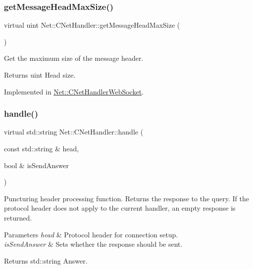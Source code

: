 \subsubsection{\texorpdfstring{get\+Message\+Head\+Max\+Size()}{getMessageHeadMaxSize()}}
{\footnotesize\ttfamily virtual uint Net\+::\+C\+Net\+Handler\+::get\+Message\+Head\+Max\+Size (\begin{DoxyParamCaption}{ }\end{DoxyParamCaption})\hspace{0.3cm}{\ttfamily [pure virtual]}}



Get the maximum size of the message header. 

\begin{DoxyReturn}{Returns}
uint Head size. 
\end{DoxyReturn}


Implemented in \mbox{\hyperlink{class_net_1_1_c_net_handler_web_socket_a5c3fa1c1f926119482b25159afffb6cd}{Net\+::\+C\+Net\+Handler\+Web\+Socket}}.

\mbox{\label{class_net_1_1_c_net_handler_a7bd761afe7eff3897b840db84f870135}} 
\subsubsection{\texorpdfstring{handle()}{handle()}}
{\footnotesize\ttfamily virtual std\+::string Net\+::\+C\+Net\+Handler\+::handle (\begin{DoxyParamCaption}\item[{const std\+::string \&}]{head,  }\item[{bool \&}]{is\+Send\+Answer }\end{DoxyParamCaption})\hspace{0.3cm}{\ttfamily [pure virtual]}}



Puncturing header processing function. Returns the response to the query. If the protocol header does not apply to the current handler, an empty response is returned. 


\begin{DoxyParams}{Parameters}
{\em head} & Protocol header for connection setup. \\
\hline
{\em is\+Send\+Answer} & Sets whether the response should be sent. \\
\hline
\end{DoxyParams}
\begin{DoxyReturn}{Returns}
std\+::string Answer. 
\end{DoxyReturn}


